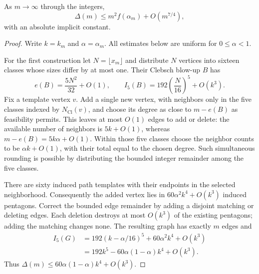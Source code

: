 \begin{proposition}
\label{prop:constructive-error}
As $m\to\infty$ through the integers,
\[
 \Delta(m)\leq m^2 f(\alpha_m)+O(m^{7/4}),
\]
with an absolute implicit constant.
\end{proposition}
\begin{proof}
Write $k=k_m$ and $\alpha=\alpha_m$. All estimates below are uniform for
$0\leq\alpha<1$.

For the first construction let $N=\lfloor x_m\rfloor$ and distribute $N$
vertices into sixteen classes whose sizes differ by at most one. Their
Clebsch blow-up $B$ has
\[
 e(B)=\frac{5N^2}{32}+O(1),\qquad
 I_5(B)=192\left(\frac{N}{16}\right)^5+O(k^3).
\]
Fix a template vertex $v$. Add a single new vertex, with neighbors only
in the five classes indexed by $N_{\mathrm{Cl}}(v)$, and choose its degree
as close to $m-e(B)$ as feasibility permits. This leaves at most $O(1)$
edges to add or delete: the available number of neighbors is $5k+O(1)$,
whereas $m-e(B)=5k\alpha+O(1)$. Within those five classes choose the
neighbor counts to be $\alpha k+O(1)$, with their total equal to the
chosen degree. Such simultaneous rounding is possible by distributing
the bounded integer remainder among the five classes.

There are sixty induced path templates with their endpoints in the
selected neighborhood. Consequently the added vertex lies in
$60\alpha^2k^4+O(k^3)$ induced pentagons. Correct the bounded edge
remainder by adding a disjoint matching or deleting edges. Each deletion
destroys at most $O(k^3)$ of the existing pentagons; adding the matching
changes none. The resulting graph has exactly $m$ edges and
\begin{align*}
 I_5(G)&=192(k-\alpha/16)^5+60\alpha^2k^4+O(k^3)\\
       &=192k^5-60\alpha(1-\alpha)k^4+O(k^3).
\end{align*}
Thus $\Delta(m)\leq60\alpha(1-\alpha)k^4+O(k^3)$.


\end{proof}
